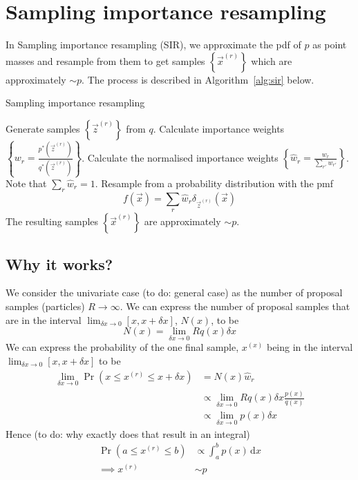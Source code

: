 \section{Sampling importance resampling}
\label{section:sir}
In Sampling importance resampling (SIR), we approximate the pdf of $p$ as point masses and resample from them to get samples $\left\{\vec x^{(r)}\right\}$ which are approximately $\sim p$. The process is described in Algorithm~\ref{alg:sir} below.
\begin{algorithm}
\caption{Sampling importance resampling}\label{alg:sir}
    \begin{algorithmic}[1]
        \State Generate samples $\left\{\vec z^{(r)}\right\}$ from $q$.
        \State Calculate importance weights $\left\{w_r = \frac{p^\ast(\vec z^{(r)})}{q^\ast(\vec z^{(r)})}\right\}$.
        \State Calculate the normalised importance weights $\left\{\hat w_r = \frac{w_r}{\sum_{r'} w_{r'}}\right\}$. Note that $\sum_r \hat w_r  = 1$.
        \State Resample from a probability distribution with the pmf
            \begin{equation}
                f(\vec x) = \sum_r \hat w_r \delta_{\vec z^{(r)}}(\vec x)
            \end{equation}
        \State The resulting samples $\left\{\vec x^{(r)}\right\}$ are approximately $\sim p$.
    \end{algorithmic}
\end{algorithm}

\subsection{Why it works?}
We consider the univariate case (to do: general case) as the number of proposal samples (particles) $R \to \infty$. We can express the number of proposal samples that are in the interval $\lim_{\delta x \to 0}[x, x + \delta x]$, $N(x)$, to be
\begin{equation}
    N(x) = \lim_{\delta x \to 0} R q(x) \delta x
\end{equation}
We can express the probability of the one final sample, $x^{(x)}$ being in the interval $\lim_{\delta x \to 0}[x, x + \delta x]$ to be
\begin{align}
    \lim_{\delta x \to 0} \Pr(x \leq x^{(r)} \leq x + \delta x) &= N(x) \hat w_r \\
                                                                &\propto \lim_{\delta x \to 0} R q(x) \delta x \frac{p(x)}{q(x)} \\
                                                                &\propto \lim_{\delta x \to 0} p(x) \delta x
\end{align}
Hence (to do: why exactly does that result in an integral)
\begin{align}
    \Pr(a \leq x^{(r)} \leq b)  &\propto \int_a^b p(x) \,\mathrm d x \\
    \implies x^{(r)}            &\sim p
\end{align}